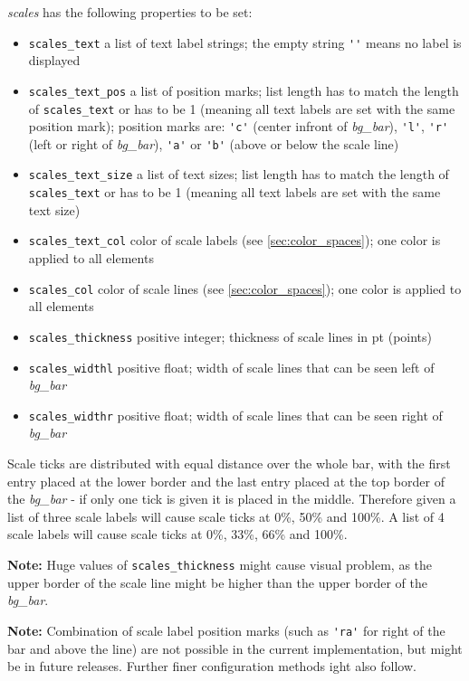 \documentclass[12pt,a4paper]{book}
\begin{document}
\textit{scales} has the following properties to be set:
\begin{itemize}
	\item \verb|scales_text| a list of text label strings; the empty string \verb|''| means no label is displayed
	\item \verb|scales_text_pos| a list of position marks; list length has to match the length of \verb|scales_text| or has to be 1 (meaning all text labels are set with the same position mark); position marks are: \verb|'c'| (center infront of \textit{bg\_bar}), \verb|'l'|, \verb|'r'| (left or right of \textit{bg\_bar}), \verb|'a'| or \verb|'b'| (above or below the scale line)
	\item \verb|scales_text_size| a list of text sizes;  list length has to match the length of \verb|scales_text| or has to be 1 (meaning all text labels are set with the same text size)
	\item \verb|scales_text_col| color of scale labels (see \ref{sec:color_spaces}); one color is applied to all elements
	\item \verb|scales_col| color of scale lines (see \ref{sec:color_spaces}); one color is applied to all elements
	\item \verb|scales_thickness| positive integer; thickness of scale lines in pt (points)
	\item \verb|scales_widthl| positive float; width of scale lines that can be seen left of \textit{bg\_bar}
	\item \verb|scales_widthr| positive float; width of scale lines that can be seen right of \textit{bg\_bar}
\end{itemize}

Scale ticks are distributed with equal distance over the whole bar, with the first entry placed at the lower border and the last entry placed at the top border of the \textit{bg\_bar} - if only one tick is given it is placed in the middle. Therefore given a list of three scale labels will cause scale ticks at 0\%, 50\% and 100\%. A list of 4 scale labels will cause scale ticks at 0\%, 33\%, 66\% and 100\%.

\textbf{Note:} Huge values of \verb|scales_thickness| might cause visual problem, as the upper border of the scale line might be higher than the upper border of the \textit{bg\_bar}.

\textbf{Note:} Combination of scale label position marks (such as \verb|'ra'| for right of the bar and above the line) are not possible in the current implementation, but might be in future releases. Further finer configuration methods ight also follow.
\end{document}
